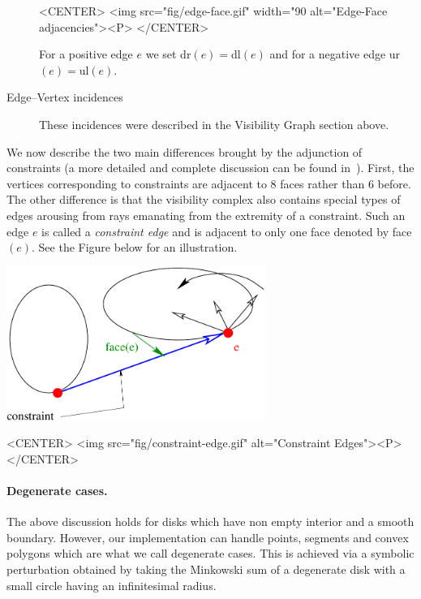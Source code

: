 \begin{description}
    \begin{ccHtmlOnly}
        <CENTER>
            <img src="fig/edge-face.gif" width="90%
             alt="Edge-Face adjacencies"><P>
        </CENTER>
    \end{ccHtmlOnly}
    For a positive edge $e$ we set dr$(e) = $dl$(e)$ and for a negative edge
    ur$(e) = $ul$(e)$.
    \item[{Edge--Vertex incidences}]These incidences were described in
    the Visibility Graph section above.
\end{description}

We now describe the two main differences brought by the adjunction of
constraints (a more detailed and complete discussion can be found
in~\cite{ap-sstvc-01}).  First, the vertices corresponding to constraints are
adjacent to $8$ faces rather than $6$ before. The other difference is that the
visibility complex also contains special types of edges arousing from rays
emanating from the extremity of a constraint. Such an edge $e$ is called a
\emph{constraint edge} and is adjacent to only one face denoted by face$(e)$.
See the Figure below for an illustration.
\begin{ccTexOnly}
    \begin{center}
        \includegraphics[height=5cm]{Visibility_complex_2/fig/constraint-edge}%
    \end{center}
\end{ccTexOnly}

\begin{ccHtmlOnly}
    <CENTER>
        <img src="fig/constraint-edge.gif" alt="Constraint Edges"><P>
    </CENTER>
\end{ccHtmlOnly}

\paragraph{Degenerate cases.} The above discussion holds for disks which have
non empty interior and a smooth boundary. However, our implementation can
handle points, segments and convex polygons which are what we call
degenerate cases.  This is achieved via a symbolic perturbation obtained by
taking the Minkowski sum of a degenerate disk with a small circle having an
infinitesimal radius.

